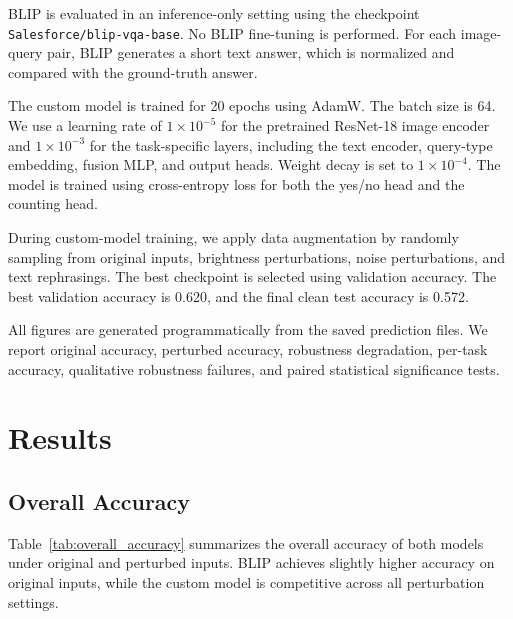 BLIP is evaluated in an inference-only setting using the checkpoint \texttt{Salesforce/blip-vqa-base}. No BLIP fine-tuning is performed. For each image-query pair, BLIP generates a short text answer, which is normalized and compared with the ground-truth answer.

The custom model is trained for 20 epochs using AdamW. The batch size is 64. We use a learning rate of $1 \times 10^{-5}$ for the pretrained ResNet-18 image encoder and $1 \times 10^{-3}$ for the task-specific layers, including the text encoder, query-type embedding, fusion MLP, and output heads. Weight decay is set to $1 \times 10^{-4}$. The model is trained using cross-entropy loss for both the yes/no head and the counting head.

During custom-model training, we apply data augmentation by randomly sampling from original inputs, brightness perturbations, noise perturbations, and text rephrasings. The best checkpoint is selected using validation accuracy. The best validation accuracy is 0.620, and the final clean test accuracy is 0.572.

All figures are generated programmatically from the saved prediction files. We report original accuracy, perturbed accuracy, robustness degradation, per-task accuracy, qualitative robustness failures, and paired statistical significance tests.

\section{Results}

\subsection{Overall Accuracy}

Table~\ref{tab:overall_accuracy} summarizes the overall accuracy of both models under original and perturbed inputs. BLIP achieves slightly higher accuracy on original inputs, while the custom model is competitive across all perturbation settings.

\begin{table}[t]
\centering
\caption{Overall accuracy under original and perturbed inputs.}
\label{tab:overall_accuracy}
\end{table}

